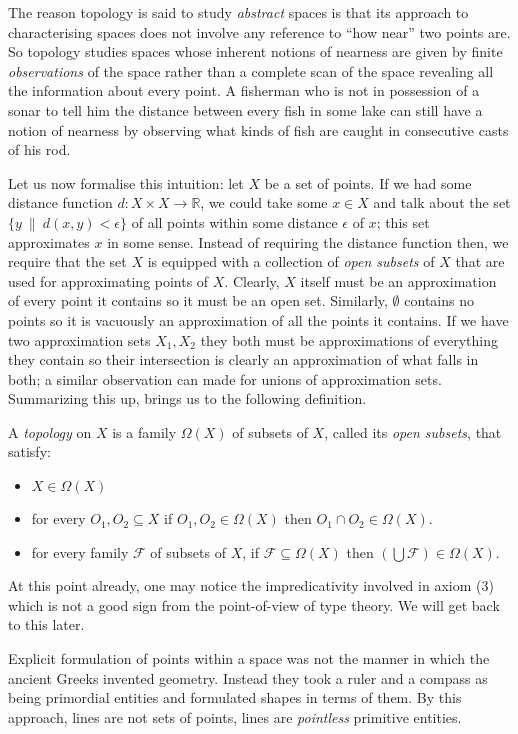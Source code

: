 \documentclass{article}
\begin{document}
The reason topology is said to study \emph{abstract} spaces is that its approach to
characterising spaces does not involve any reference to ``how near'' two points are. So
topology studies spaces whose inherent notions of nearness are given by finite
\emph{observations} of the space rather than a complete scan of the space revealing all
the information about every point. A fisherman who is not in possession of a sonar to tell
him the distance between every fish in some lake can still have a notion of nearness by
observing what kinds of fish are caught in consecutive casts of his rod.

Let us now formalise this intuition: let $X$ be a set of points. If we had some distance
function $d : X \times X \rightarrow \mathbb{R}$, we could take some $x \in X$ and talk about the set $\{
y\ \|\ d(x, y) < \epsilon \}$ of all points within some distance $\epsilon$ of $x$; this set
approximates $x$ in some sense. Instead of requiring the distance function then, we
require that the set $X$ is equipped with a collection of \emph{open subsets} of $X$ that
are used for approximating points of $X$. Clearly, $X$ itself must be an approximation of
every point it contains so it must be an open set. Similarly, $\emptyset$ contains no points so it
is vacuously an approximation of all the points it contains. If we have two approximation
sets $X_1, X_2$ they both must be approximations of everything they contain so their
intersection is clearly an approximation of what falls in both; a similar observation can
made for unions of approximation sets. Summarizing this up, brings us to the following
definition.

A \emph{topology} on $X$ is a family $\Omega(X)$ of subsets of $X$, called its
\emph{open subsets}, that satisfy:
\begin{itemize}
  \item $X \in \Omega(X)$
  \item for every $O_1, O_2 \subseteq X$ if $O_1, O_2 \in \Omega(X)$ then $O_1 \cap O_2 \in \Omega(X)$.
  \item for every family $\mathcal{F}$ of subsets of $X$, if $\mathcal{F} \subseteq \Omega(X)$ then
    $(\bigcup \mathcal{F}) \in \Omega(X)$.
\end{itemize}

At this point already, one may notice the impredicativity involved in axiom (3) which is
not a good sign from the point-of-view of type theory. We will get back to this later.

Explicit formulation of points within a space was not the manner in which the ancient
Greeks invented geometry. Instead they took a ruler and a compass as being primordial
entities and formulated shapes in terms of them. By this approach, lines are not sets of
points, lines are \emph{pointless} primitive entities.
\end{document}
